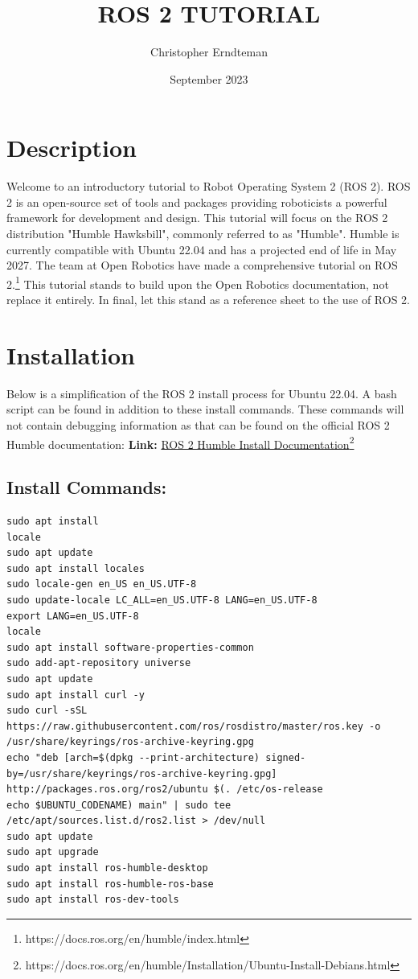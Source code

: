 \documentclass[11pt]{article}
\title{ROS 2 TUTORIAL}
\author{Christopher Erndteman}
\date{September 2023}
\newcommand{\link}[2]{\textbf{Link: }\textcolor{blue}{\href{#2}{#1}}\footnote{#2}}
\begin{document}
\maketitle
\tableofcontents
\newpage
 
\section{Description}
Welcome to an introductory tutorial to Robot Operating System 2 (ROS 2).
ROS 2 is an open-source set of tools and packages providing roboticists a powerful framework for development and design. This tutorial will focus on the ROS 2 distribution "Humble Hawksbill", commonly referred to as "Humble". Humble is currently compatible with Ubuntu 22.04 and has a projected end of life in May 2027.
The team at Open Robotics have made a comprehensive tutorial on ROS 2.\footnote{https://docs.ros.org/en/humble/index.html} This tutorial stands to build upon the Open Robotics documentation, not replace it entirely. In final, let this stand as a reference sheet to the use of ROS 2.



\section{Installation}
Below is a simplification of the ROS 2 install process for Ubuntu 22.04.
A bash script can be found in addition to these install commands. These commands will not contain debugging information as that can be found on the official ROS 2 Humble documentation: 
\link{ROS 2 Humble Install Documentation}{https://docs.ros.org/en/humble/Installation/Ubuntu-Install-Debians.html}

\pagebreak
\noindent
\subsection{Install Commands: }
\lstset{language=bash}
\begin{lstlisting}
sudo apt install
locale
sudo apt update
sudo apt install locales
sudo locale-gen en_US en_US.UTF-8
sudo update-locale LC_ALL=en_US.UTF-8 LANG=en_US.UTF-8
export LANG=en_US.UTF-8
locale
sudo apt install software-properties-common
sudo add-apt-repository universe
sudo apt update
sudo apt install curl -y 
sudo curl -sSL https://raw.githubusercontent.com/ros/rosdistro/master/ros.key -o /usr/share/keyrings/ros-archive-keyring.gpg
echo "deb [arch=$(dpkg --print-architecture) signed-by=/usr/share/keyrings/ros-archive-keyring.gpg] http://packages.ros.org/ros2/ubuntu $(. /etc/os-release 
echo $UBUNTU_CODENAME) main" | sudo tee /etc/apt/sources.list.d/ros2.list > /dev/null
sudo apt update
sudo apt upgrade
sudo apt install ros-humble-desktop
sudo apt install ros-humble-ros-base
sudo apt install ros-dev-tools
\end{lstlisting}
\end{document}
